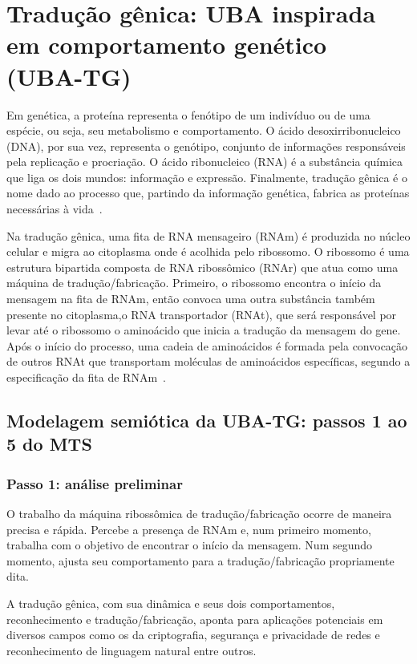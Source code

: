 \chapter{Tradução gênica: UBA inspirada em comportamento genético (UBA-TG)}

Em genética, a proteína representa o fenótipo de um indivíduo ou de uma espécie, ou seja, seu metabolismo e comportamento. O ácido desoxirribonucleico (DNA), por sua vez, representa o genótipo, conjunto de informações responsáveis pela replicação e procriação. O ácido ribonucleico (RNA) é a substância química que liga os dois mundos: informação e expressão. Finalmente, tradução gênica é o nome dado ao processo que, partindo da informação genética, fabrica as proteínas necessárias à vida~\cite{ridley99}.

Na tradução gênica, uma fita de RNA mensageiro (RNAm) é produzida no núcleo celular e migra ao citoplasma onde é acolhida pelo ribossomo. O ribossomo é uma estrutura bipartida composta de RNA ribossômico (RNAr) que atua como uma máquina de tradução/fabricação. Primeiro, o ribossomo encontra o início da mensagem na fita de RNAm, então convoca uma outra substância também presente no citoplasma,o RNA transportador (RNAt), que será responsável por levar até o ribossomo o aminoácido que inicia a tradução da mensagem do gene. Após o início do processo, uma cadeia de aminoácidos é formada pela convocação de outros RNAt que transportam  moléculas de aminoácidos específicas, segundo a especificação da fita de RNAm~\cite{ridley99}.

\section{Modelagem semiótica da UBA-TG: passos 1 ao 5 do MTS}

\subsection{Passo 1: análise preliminar}

O trabalho da máquina ribossômica de tradução/fabricação ocorre de maneira precisa e rápida. Percebe a presença de RNAm e, num primeiro momento, trabalha com o objetivo de encontrar o início da mensagem. Num segundo momento, ajusta seu comportamento para a tradução/fabricação propriamente dita.

A tradução gênica, com sua dinâmica e seus dois comportamentos, reconhecimento e tradução/fabricação, aponta para aplicações potenciais em diversos campos como os da criptografia, segurança e privacidade de redes e reconhecimento de linguagem natural entre outros.


